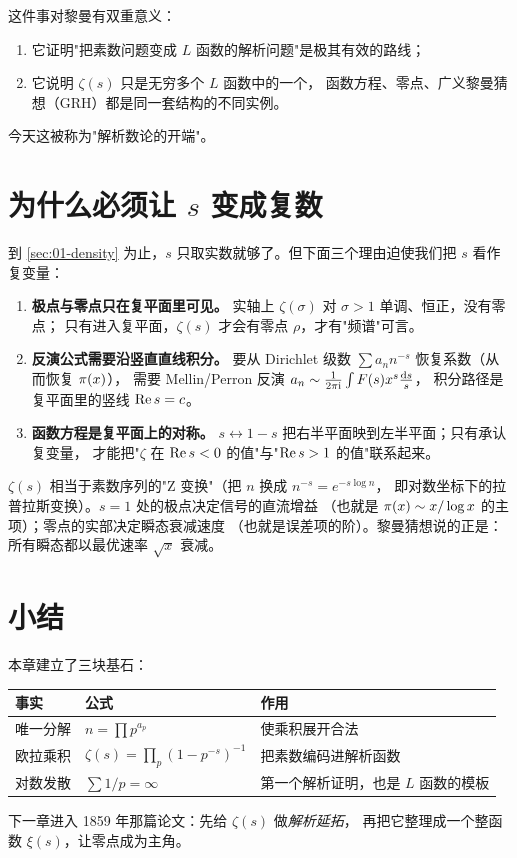 这件事对黎曼有双重意义：
\begin{enumerate}[label=(\roman*)]
  \item 它证明"把素数问题变成 $L$ 函数的解析问题"是极其有效的路线；
  \item 它说明 $\zeta(s)$ 只是无穷多个 $L$ 函数中的一个，
        函数方程、零点、广义黎曼猜想（GRH）都是同一套结构的不同实例。
\end{enumerate}
今天这被称为"解析数论的开端"\cite{davenport2000}。

\section{为什么必须让 $s$ 变成复数}
\label{sec:01-complex}

到 \cref{sec:01-density} 为止，$s$ 只取实数就够了。但下面三个理由迫使我们把
$s$ 看作复变量：

\begin{enumerate}[label=\arabic*.]
  \item \textbf{极点与零点只在复平面里可见。}
        实轴上 $\zeta(\sigma)$ 对 $\sigma>1$ 单调、恒正，没有零点；
        只有进入复平面，$\zeta(s)$ 才会有零点 $\rho$，才有"频谱"可言。
  \item \textbf{反演公式需要沿竖直直线积分。}
        要从 Dirichlet 级数 $\sum a_n n^{-s}$ 恢复系数（从而恢复 $\pi(x)$），
        需要 Mellin/Perron 反演 $a_n\sim\frac{1}{2\pi\mathrm{i}}\int F(s)x^s\frac{\mathop{}\!\mathrm{d} s}{s}$，
        积分路径是复平面里的竖线 $\operatorname{Re} s=c$。
  \item \textbf{函数方程是复平面上的对称。}
        $s\leftrightarrow 1-s$ 把右半平面映到左半平面；只有承认复变量，
        才能把"$\zeta$ 在 $\operatorname{Re} s<0$ 的值"与"$\operatorname{Re} s>1$ 的值"联系起来。
\end{enumerate}

\begin{histbox}[给工程师的类比]
$\zeta(s)$ 相当于素数序列的"Z 变换"（把 $n$ 换成 $n^{-s}=e^{-s\log n}$，
即对数坐标下的拉普拉斯变换）。$s=1$ 处的极点决定信号的直流增益
（也就是 $\pi(x)\sim x/\log x$ 的主项）；零点的实部决定瞬态衰减速度
（也就是误差项的阶）。黎曼猜想说的正是：所有瞬态都以最优速率 $\sqrt{x}$ 衰减。
\end{histbox}

\section{小结}
\label{sec:01-summary}

本章建立了三块基石：
\begin{center}
\begin{tabular}{@{}lll@{}}
\toprule
\textbf{事实} & \textbf{公式} & \textbf{作用}\\
\midrule
唯一分解 & $n=\prod p^{a_p}$ & 使乘积展开合法\\
欧拉乘积 & $\zeta(s)=\prod_p(1-p^{-s})^{-1}$ & 把素数编码进解析函数\\
对数发散 & $\sum 1/p=\infty$ & 第一个解析证明，也是 $L$ 函数的模板\\
\bottomrule
\end{tabular}
\end{center}
下一章进入 1859 年那篇论文：先给 $\zeta(s)$ 做\emph{解析延拓}，
再把它整理成一个整函数 $\xi(s)$，让零点成为主角。
